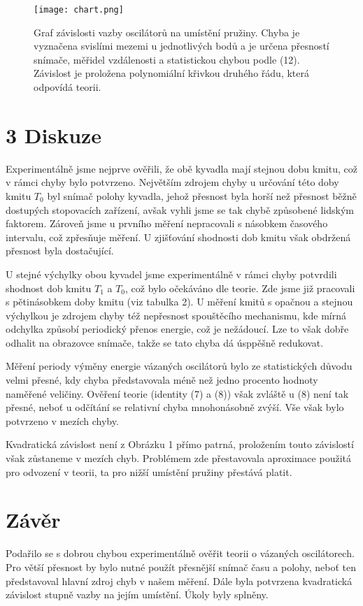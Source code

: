 \documentclass[a4paper]{article}
\begin{document}
\par
\begin{figure}
\centering
\texttt{[image: chart.png]}
\caption{Graf závislosti vazby oscilátorů na umístění pružiny. Chyba je vyznačena svislími mezemi u jednotlivých bodů a je určena přesností snímače, měřidel vzdálenosti a statistickou chybou podle (12). Závislost je proložena polynomiální křivkou druhého řádu, která odpovídá teorii. }
\end{figure}
\newline
\newline
\newpage\section*{3 Diskuze}
\par Experimentálně jsme nejprve ověřili, že obě kyvadla mají stejnou dobu kmitu, což v rámci chyby bylo potvrzeno. Největším zdrojem chyby u určování této doby kmitu $T_0$ byl snímač polohy kyvadla, jehož přesnost byla horší než přesnost běžně dostupých stopovacích zařízení, avšak vyhli jsme se tak chybě způsobené lidským faktorem. Zároveň jsme u prvního měření nepracovali s násobkem časového intervalu, což zpřesňuje měření. U zjišťování shodnosti dob kmitu však obdržená přesnost byla dostačující.
\par U stejné výchylky obou kyvadel jsme experimentálně v rámci chyby potvrdili shodnost dob kmitu $T_1$ a $T_0$, což bylo očekáváno dle teorie. Zde jsme již pracovali s pětinásobkem doby kmitu (viz tabulka 2). U měření kmitů s opačnou a stejnou výchylkou je zdrojem chyby též nepřesnost spouštěcího mechanismu, kde mírná odchylka způsobí periodický přenos energie, což je nežádoucí. Lze to však dobře odhalit na obrazovce snímače, takže se tato chyba dá úsppěšně redukovat.
\par Měření periody výměny energie vázaných oscilátorů bylo ze statistických důvodu velmi přesné, kdy chyba představovala méně než jedno procento hodnoty naměřené veličiny. Ověření teorie (identity (7) a (8)) však zvláště u (8) není tak přesné, neboť u odčítání se relativní chyba mnohonásobně zvýší. Vše však bylo potvrzeno v mezích chyby.
\par Kvadratická závislost není z Obrázku 1 přímo patrná, proložením touto závislostí však zůstaneme v mezích chyb. Problémem zde přestavovala aproximace použitá pro odvození v teorii, ta pro nižší umístění pružiny přestává platit. 
\section*{Závěr}
\par Podařilo se s dobrou chybou experimentálně ověřit teorii o vázaných oscilátorech. Pro větší přesnost by bylo nutné použít přesnější snímač času a polohy, neboť ten představoval hlavní zdroj chyb v našem měření. Dále byla potvrzena kvadratická závislost stupně vazby na jejím umístění. Úkoly byly splněny.
\end{document}
